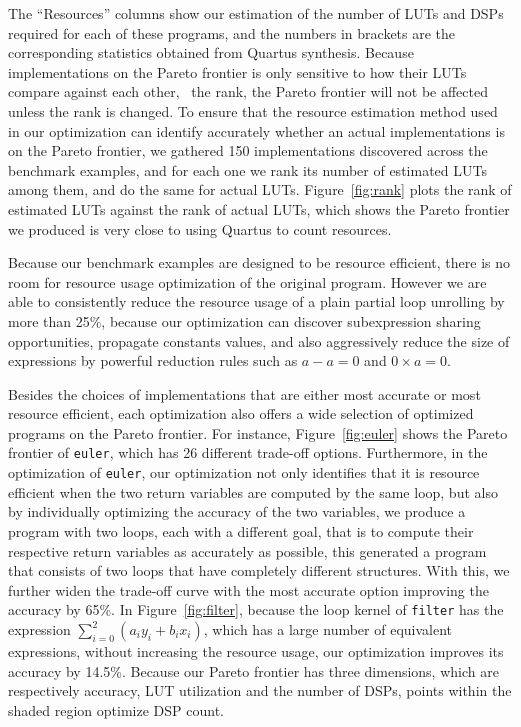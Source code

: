 \begin{figure*}[ht]
    \centering
    \begin{minipage}{0.6\textwidth}
    \end{minipage}\quad\begin{minipage}{0.35\textwidth}
    \end{minipage}
\end{figure*}

The ``Resources'' columns show our estimation of the number of LUTs and
DSPs required for each of these programs, and the numbers in brackets are
the corresponding statistics obtained from Quartus synthesis.  Because
implementations on the Pareto frontier is only sensitive to how their LUTs
compare against each other, \ie~the rank, the Pareto frontier will not be
affected unless the rank is changed.  To ensure that the resource estimation
method used in our optimization can identify accurately whether an actual
implementations is on the Pareto frontier, we gathered 150 implementations
discovered across the benchmark examples, and for each one we rank its
number of estimated LUTs among them, and do the same for actual LUTs.
Figure~\ref{fig:rank} plots the rank of estimated LUTs against the rank of
actual LUTs, which shows the Pareto frontier we produced is very close to using
Quartus to count resources.

Because our benchmark examples are designed to be resource efficient, there
is no room for resource usage optimization of the original program.  However
we are able to consistently reduce the resource usage of a plain partial
loop unrolling by more than 25\%, because our optimization can discover
subexpression sharing opportunities, propagate constants values, and also
aggressively reduce the size of expressions by powerful reduction rules such as
$a - a = 0$ and $0 \times a = 0$.

Besides the choices of implementations that are either most accurate or most
resource efficient, each optimization also offers a wide selection of optimized
programs on the Pareto frontier.  For instance, Figure~\ref{fig:euler} shows
the Pareto frontier of \texttt{euler}, which has 26 different trade-off
options.  Furthermore, in the optimization of \texttt{euler}, our optimization
not only identifies that it is resource efficient when the two return variables
are computed by the same loop, but also by individually optimizing the
accuracy of the two variables, we produce a program with two loops, each with
a different goal, that is to compute their respective return variables as
accurately as possible, this generated a program that consists of two loops
that have completely different structures.  With this, we further widen the
trade-off curve with the most accurate option improving the accuracy by 65\%.
In Figure~\ref{fig:filter}, because the loop kernel of \texttt{filter} has the
expression $\sum_{i=0}^2{(a_i y_i + b_i x_i)}$, which has a large number of
equivalent expressions, without increasing the resource usage, our optimization
improves its accuracy by 14.5\%.  Because our Pareto frontier has three
dimensions, which are respectively accuracy, LUT utilization and the number of
DSPs, points within the shaded region optimize DSP count.

